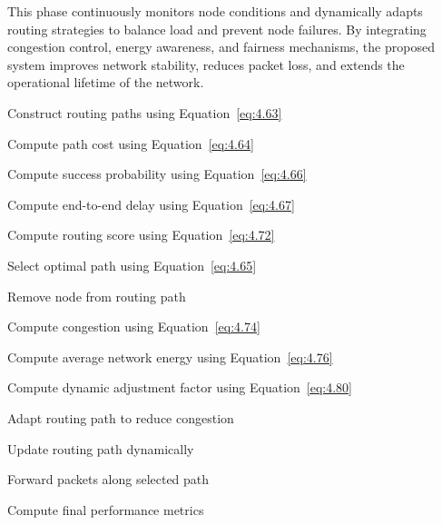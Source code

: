 \documentclass[a4paper,fleqn]{cas-dc}
\numberwithin{equation}{section}
\begin{document}
This phase continuously monitors node conditions and dynamically adapts routing strategies to balance load and prevent node failures. By integrating congestion control, energy awareness, and fairness mechanisms, the proposed system improves network stability, reduces packet loss, and extends the operational lifetime of the network.

\begin{algorithm}[!ht]
\caption{Algorithm 2: Adaptive Routing and Network Adaptation}
\label{alg:routing}
\begin{algorithmic}[1]

\STATE Construct routing paths using Equation~\ref{eq:4.63}


    \STATE Compute path cost using Equation~\ref{eq:4.64}

    \STATE Compute success probability using Equation~\ref{eq:4.66}

    \STATE Compute end-to-end delay using Equation~\ref{eq:4.67}

    \STATE Compute routing score using Equation~\ref{eq:4.72}

\ENDFOR

\STATE Select optimal path using Equation~\ref{eq:4.65}



        \STATE Remove node from routing path

    \ENDIF

    \STATE Compute congestion using Equation~\ref{eq:4.74}

    \STATE Compute average network energy using Equation~\ref{eq:4.76}

    \STATE Compute dynamic adjustment factor using Equation~\ref{eq:4.80}


        \STATE Adapt routing path to reduce congestion

    \ENDIF

\ENDFOR

\STATE Update routing path dynamically

\STATE Forward packets along selected path

\STATE Compute final performance metrics

\end{algorithmic}
\end{algorithm}
\end{document}
